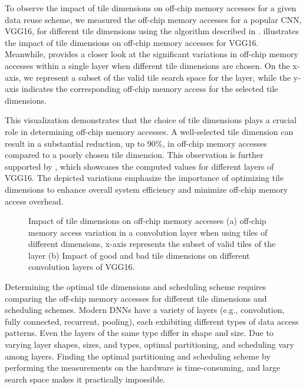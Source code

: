 To observe the impact of tile dimensions on off-chip memory accesses for a given data reuse scheme, we measured the off-chip memory accesses for a popular CNN, VGG16, for different tile dimensions using the algorithm described in .  illustrates the impact of tile dimensions on off-chip memory accesses for VGG16. Meanwhile,  provides a closer look at the significant variations in off-chip memory accesses within a single layer when different tile dimensions are chosen. On the x-axis, we represent a subset of the valid tile search space for the layer, while the y-axis indicates the corresponding off-chip memory access for the selected tile dimensions.

This visualization demonstrates that the choice of tile dimensions plays a crucial role in determining off-chip memory accesses. A well-selected tile dimension can result in a substantial reduction, up to 90\%, in off-chip memory accesses compared to a poorly chosen tile dimension. This observation is further supported by , which showcases the computed values for different layers of VGG16. The depicted variations emphasize the importance of optimizing tile dimensions to enhance overall system efficiency and minimize off-chip memory access overhead.

\begin{figure}[!h]
	\centering
	\captionsetup{font=sf}
	\hfil	
	\hfil	
	\caption{Impact of tile dimensions on off-chip memory accesses (a) off-chip memory access variation in a convolution layer when using tiles of different dimensions, x-axis represents the subset of valid tiles of the layer (b) Impact of good and bad tile dimensions on different convolution layers of VGG16.}
	\label{fig:impactOfTileDims}
\end{figure}

Determining the optimal tile dimensions and scheduling scheme requires comparing the off-chip memory accesses for different tile dimensions and scheduling schemes. Modern DNNs have a variety of layers (e.g., convolution, fully connected, recurrent, pooling), each exhibiting different types of data access patterns. Even the layers of the same type differ in shape and size. Due to varying layer shapes, sizes, and types, optimal partitioning, and scheduling vary among layers. Finding the optimal partitioning and scheduling scheme by performing the measurements on the hardware is time-consuming, and large search space makes it practically impossible.

